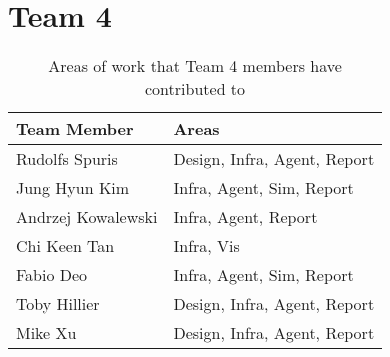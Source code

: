 \section{Team 4}
\label{sec:roles_appendix:team4}


\begin{table}[H]
    \centering
    \begin{tabular}{|l|l|}
    \hline
    \textbf{Team Member} & \textbf{Areas}     \\ \hline
    Rudolfs Spuris  & Design, Infra, Agent, Report        \\
    Jung Hyun Kim  & Infra, Agent, Sim, Report                 \\
    Andrzej Kowalewski     & Infra, Agent, Report        \\
    Chi Keen Tan     & Infra, Vis \\
    Fabio Deo    & Infra, Agent, Sim, Report                      \\
    Toby Hillier  & Design, Infra, Agent, Report                     \\
    Mike Xu  & Design, Infra, Agent, Report                       \\
    \hline
\end{tabular}
\caption{Areas of work that Team 4 members have contributed to}
\end{table}